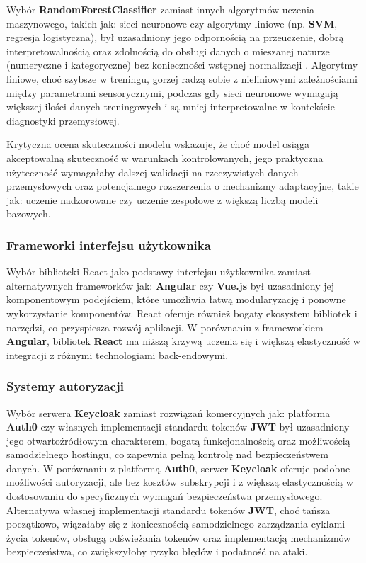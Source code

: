 Wybór \textbf{\mbox{RandomForestClassifier}} zamiast innych algorytmów uczenia maszynowego, takich jak: sieci neuronowe czy algorytmy liniowe (np. \textbf{\mbox{SVM}}, regresja logistyczna), był uzasadniony jego odpornością na przeuczenie, dobrą interpretowalnością oraz zdolnością do obsługi danych o mieszanej naturze (numeryczne i kategoryczne) bez konieczności wstępnej normalizacji \cite{spark_mllib_reference}. Algorytmy liniowe, choć szybsze w treningu, gorzej radzą sobie z nieliniowymi zależnościami między parametrami sensorycznymi, podczas gdy sieci neuronowe wymagają większej ilości danych treningowych i są mniej interpretowalne w kontekście diagnostyki przemysłowej.

Krytyczna ocena skuteczności modelu wskazuje, że choć model osiąga akceptowalną skuteczność w warunkach kontrolowanych, jego praktyczna użyteczność wymagałaby dalszej walidacji na rzeczywistych danych przemysłowych oraz potencjalnego rozszerzenia o mechanizmy adaptacyjne, takie jak: uczenie nadzorowane czy uczenie zespołowe z większą liczbą modeli bazowych.

\subsubsection{Frameworki interfejsu użytkownika}

Wybór biblioteki React jako podstawy interfejsu użytkownika zamiast alternatywnych frameworków jak: \textbf{\mbox{Angular}} czy \textbf{\mbox{Vue.js}} był uzasadniony jej komponentowym podejściem, które umożliwia łatwą modularyzację i ponowne wykorzystanie komponentów. React oferuje również bogaty ekosystem bibliotek i narzędzi, co przyspiesza rozwój aplikacji. W porównaniu z frameworkiem \textbf{\mbox{Angular}}, bibliotek \textbf{\mbox{React}} ma niższą krzywą uczenia się i większą elastyczność w integracji z różnymi technologiami back-endowymi.

\subsubsection{Systemy autoryzacji}

Wybór serwera \textbf{\mbox{Keycloak}} \cite{keycloak_docs} zamiast rozwiązań komercyjnych jak: platforma \textbf{\mbox{Auth0}} czy własnych implementacji standardu tokenów \textbf{\mbox{JWT}} \cite{jwt_rfc} był uzasadniony jego otwartoźródłowym charakterem, bogatą funkcjonalnością oraz możliwością samodzielnego hostingu, co zapewnia pełną kontrolę nad bezpieczeństwem danych. W porównaniu z platformą \textbf{\mbox{Auth0}}, serwer \textbf{\mbox{Keycloak}} oferuje podobne możliwości autoryzacji, ale bez kosztów subskrypcji i z większą elastycznością w dostosowaniu do specyficznych wymagań bezpieczeństwa przemysłowego. Alternatywa własnej implementacji standardu tokenów \textbf{\mbox{JWT}}, choć tańsza początkowo, wiązałaby się z koniecznością samodzielnego zarządzania cyklami życia tokenów, obsługą odświeżania tokenów oraz implementacją mechanizmów bezpieczeństwa, co zwiększyłoby ryzyko błędów i podatność na ataki.

